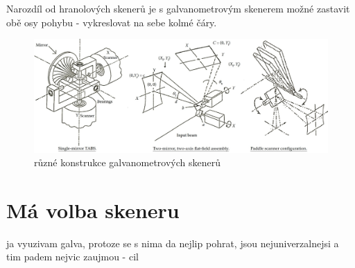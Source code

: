 Narozdíl od hranolových skenerů je s galvanometrovým skenerem možné zastavit obě osy pohybu - vykreslovat na sebe kolmé čáry.

\begin{figure}[!htb]
  \centering
  \includegraphics[width=1\textwidth]{img/scanner-constructions.jpg}
  \caption{\label{fig:scanner-constructions} různé konstrukce galvanometrových skenerů}
\end{figure}

\section{Má volba skeneru}

ja vyuzivam galva, protoze se s nima da nejlip pohrat, jsou nejuniverzalnejsi a tim padem nejvic zaujmou - cil